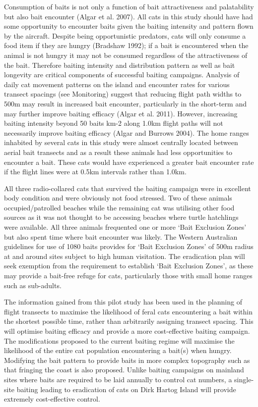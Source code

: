 \documentclass[version=last,
    paper=a4,                               %
    10pt,                                   %
    dvipsnames,
    oneside,                              %
    headings=openany,                       %
    open=any,
    BCOR=7mm,                               %
    DIV=15,     %
]{scrbook}
\begin{document}
Consumption of baits is not only a function of bait attractiveness and
palatability but also bait encounter (Algar et al. 2007). All cats in
this study should have had some opportunity to encounter baits given the
baiting intensity and pattern flown by the aircraft. Despite being
opportunistic predators, cats will only consume a food item if they are
hungry (Bradshaw 1992); if a bait is encountered when the animal is not
hungry it may not be consumed regardless of the attractiveness of the
bait. Therefore baiting intensity and distribution pattern as well as
bait longevity are critical components of successful baiting campaigns.
Analysis of daily cat movement patterns on the island and encounter
rates for various transect spacings (see Monitoring) suggest that
reducing flight path widths to 500m may result in increased bait
encounter, particularly in the short-term and may further improve
baiting efficacy (Algar et al. 2011). However, increasing baiting
intensity beyond 50 baits km-2 along 1.0km flight paths will not
necessarily improve baiting efficacy (Algar and Burrows 2004). The home
ranges inhabited by several cats in this study were almost centrally
located between aerial bait transects and as a result these animals had
less opportunities to encounter a bait. These cats would have
experienced a greater bait encounter rate if the flight lines were at
0.5km intervals rather than 1.0km.

All three radio-collared cats that survived the baiting campaign were in
excellent body condition and were obviously not food stressed. Two of
these animals occupied/patrolled beaches while the remaining cat was
utilising other food sources as it was not thought to be accessing
beaches where turtle hatchlings were available. All three animals
frequented one or more `Bait Exclusion Zones' but also spent time where
bait encounter was likely. The Western Australian guidelines for use of
1080 baits provides for `Bait Exclusion Zones' of 500m radius at and
around sites subject to high human visitation. The eradication plan will
seek exemption from the requirement to establish `Bait Exclusion Zones',
as these may provide a bait-free refuge for cats, particularly those
with small home ranges such as sub-adults.

The information gained from this pilot study has been used in the
planning of flight transects to maximise the likelihood of feral cats
encountering a bait within the shortest possible time, rather than
arbitrarily assigning transect spacing. This will optimise baiting
efficacy and provide a more cost-effective baiting campaign. The
modifications proposed to the current baiting regime will maximise the
likelihood of the entire cat population encountering a bait(s) when
hungry. Modifying the bait pattern to provide baits in more complex
topography such as that fringing the coast is also proposed. Unlike
baiting campaigns on mainland sites where baits are required to be laid
annually to control cat numbers, a single-site baiting leading to
eradication of cats on Dirk Hartog Island will provide extremely
cost-effective control.
\end{document}
